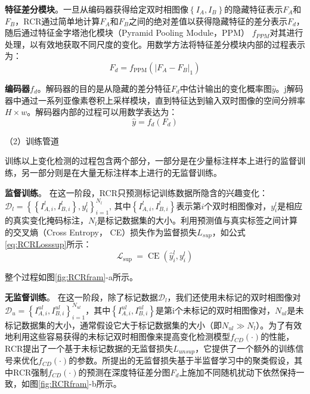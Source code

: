 \documentclass[lang=chs, degree=master, blindreview=false, adobe=false]{yanputhesis}
\begin{document}
\textbf{特征差分模块}。一旦从编码器获得给定双时相图像$\left \{ I_A, I_B \right \} $的隐藏特征表示$F_A$和$F_B$，RCR通过简单地计算$F_A$和$F_B$之间的绝对差值以获得隐藏特征的差分表示$F_d$，随后通过特征金字塔池化模块（Pyramid Pooling Module，PPM）\cite{zhao2017PPM} $f_{PPM}$对其进行处理，以有效地获取不同尺度的变化。用数学方法将特征差分模块内部的过程表示为：
\begin{equation}
  \label{eq:RCRppm}
  F_{d}=f_{\mathrm{PPM}}\left(\left|F_{A}-F_{B}\right|_{1}\right)
\end{equation}

\textbf{编码器$f_{d}$}。解码器的目的是从隐藏的差分特征$F_d$中估计输出的变化概率图$\hat{y} $。j解码器中通过一系列亚像素卷积上采样模块\cite{shi2016upsample}，直到特征达到输入双时图像的空间分辨率$H \times w$。解码器内部的过程可以用数学表达为：
\begin{equation}
  \label{eq:RCRdecode}
  \hat{y}=f_{d}\left(F_{d}\right)
\end{equation}

（2）训练管道

训练以上变化检测的过程包含两个部分，一部分是在少量标注样本上进行的监督训练，另一部分则是在大量无标注样本上进行的无监督训练。

\textbf{监督训练}。
在这一阶段，RCR只预测标记训练数据所隐含的兴趣变化：$\mathcal{D}_{l}=\left\{\left\{I_{A, i}^{l}, I_{B, i}^{l}\right\}, y_{i}^{l}\right\}_{i=1}^{N_{l}}$, 其中$\left\{I_{A, i}^{l}, I_{B, i}^{l}\right\}$表示第$i$个双时相图像对，$y_{i}^{l}$是相应的真实变化掩码标注，${N_{l}}$是标记数据集的大小。利用预测值与真实标签之间计算的交叉熵（Cross Entropy， CE）损失\cite{murphy2012CE}作为监督损失$L_{sup}$，如公式\ref{eq:RCRLosssup}所示：
\begin{equation}
  \label{eq:RCRLosssup}
  \mathcal{L}_{\text {sup }}=\operatorname{CE}\left(\hat{y}_{i}^{l}, y_{i}^{l}\right)
\end{equation}

整个过程如图\ref{fig:RCRfram}-a所示。

\textbf{无监督训练}。
在这一阶段，除了标记数据$\mathcal{D}_{l}$，我们还使用未标记的双时相图像对$\mathcal{D}_{u}=\left\{I_{A, i}^{ul}, I_{B, i}^{ul}\right\}_{i=1}^{N_{ul}}$，其中$\left\{I_{A, i}^{ul}, I_{B, i}^{ul}\right\}$是第i个未标记的双时相图像对，$N_{ul}$是未标记数据集的大小，通常假设它大于标记数据集的大小（即$N_{u l} \gg N_{l}$）。为了有效地利用这些容易获得的未标记双时相图像来提高变化检测模型$f_{C D}(\cdot)$的性能，RCR提出了一个基于未标记数据的无监督损失$L_{unsup}$，它提供了一个额外的训练信号来优化$f_{C D}(\cdot)$的参数。所提出的无监督损失基于半监督学习中的聚类假设，其中RCR强制$f_{C D}(\cdot)$的预测在深度特征差分图$F_d$上施加不同随机扰动下依然保持一致，如图\ref{fig:RCRfram}-b所示。
\end{document}
